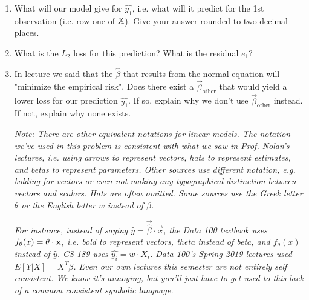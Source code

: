 \documentclass[addpoints, 12pt]{exam}
\begin{document}
\begin{questions}
\begin{enumerate}[label=\alph*.]
\item What will our model give for $\hat{y_1}$, i.e. what will it predict for the 1st observation (i.e. row one of $\Bbb{X}$). Give your answer rounded to two decimal places. 

\item What is the $L_2$ loss for this prediction? What is the residual $e_1$? 

\item In lecture we said that the $\hat{\beta}$ that results from the normal equation will "minimize the empirical risk". Does there exist a $\vec{\beta}_{\text{other}}$ that would yield a lower loss for our prediction $\hat{y_1}$. If so, explain why we don't use $\vec{\beta}_{\text{other}}$ instead. If not, explain why none exists.

\vspace{0.5cm}

\textit{Note: There are other equivalent notations for linear models. The notation we've used in this problem is consistent with what we saw in Prof. Nolan's lectures, i.e. using arrows to represent vectors, hats to represent estimates, and betas to represent parameters. Other sources use different notation, e.g. bolding for vectors or even not making any typographical distinction between vectors and scalars. Hats are often omitted. Some sources use the Greek letter $\theta$ or the English letter $w$ instead of $\beta$.}

\textit{For instance, instead of saying $\hat{y} = \vec{\hat{\beta}} \cdot \vec{x}$, the Data 100 textbook uses $f_\theta(x) = \bold{\theta} \cdot \bold{x}$, i.e. bold to represent vectors, theta instead of beta, and $f_\theta(x)$ instead of $\hat{y}$. CS 189 uses $\hat{y_i} = w \cdot X_i$. Data 100's Spring 2019 lectures used $E[Y|X] = X^T \beta$. Even our own lectures this semester are not entirely self consistent. We know it's annoying, but you'll just have to get used to this lack of a common consistent symbolic language.}

\end{enumerate}



\newpage


\vspace{-1em}



\end{questions}
\end{document}
